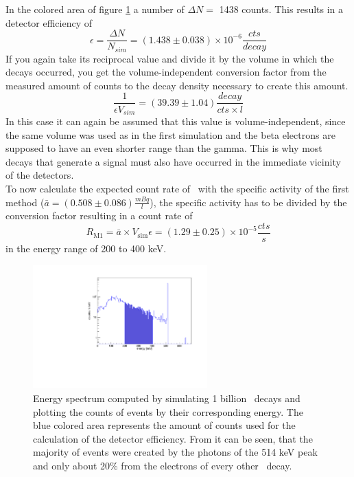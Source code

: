 In the colored area of figure \ref{fig:Sim1Spektrum} a number of $\Delta N =$ 1438 counts.
This results in a detector efficiency of 
\begin{equation*}
\epsilon = \frac{\Delta N}{N_{sim}} = (1.438 \pm 0.038) \times 10^{-6} \frac{\unit{cts}}{\unit{decay}}
\end{equation*}
If you again take its reciprocal value and divide it by the volume in which the decays occurred, you get the volume-independent conversion factor from the measured amount of counts to the decay density necessary to create this amount.
\begin{equation*}
\frac{1}{\epsilon V_{sim}} = (39.39 \pm 1.04) \frac{\unit{decay}}{\unit{cts \times l}}
\end{equation*}
In this case it can again be assumed that this value is volume-independent, since the same volume was used as in the first simulation and the beta electrons are supposed to have an even shorter range than the gamma.
This is why most decays that generate a signal must also have occurred in the immediate vicinity of the detectors.
\\

To now calculate the expected count rate of \Kr\ with the specific activity of the first method ($\bar{a} = (0.508\pm0.086)\frac{\unit{mBq}}{\unit{l}}$), the specific activity has to be divided by the conversion factor resulting in a count rate of 
\begin{equation*}
R_{\mathrm{M1}} = \bar{a} \times V_{\mathrm{sim}} \epsilon =  (1.29\pm0.25) \times 10^{-5} \frac{\unit{cts}}{\unit{s}}
\end{equation*}
in the energy range of 200 to 400 keV.

\begin{figure}
	\centering
	\includegraphics[width=0.6\textwidth]{./Bilder/Sim1Phasenraum.pdf}
	\caption{
		Energy spectrum computed by simulating 1 billion \Kr\ decays and plotting the counts of events by their corresponding energy.
		The blue colored area represents the amount of counts used for the calculation of the detector efficiency.
		From it can be seen, that the majority of events were created by the photons of the 514 keV peak and only about 20$\%$ from the electrons of every other \Kr\ decay.
	}
	\label{fig:Sim1Spektrum}
\end{figure}

